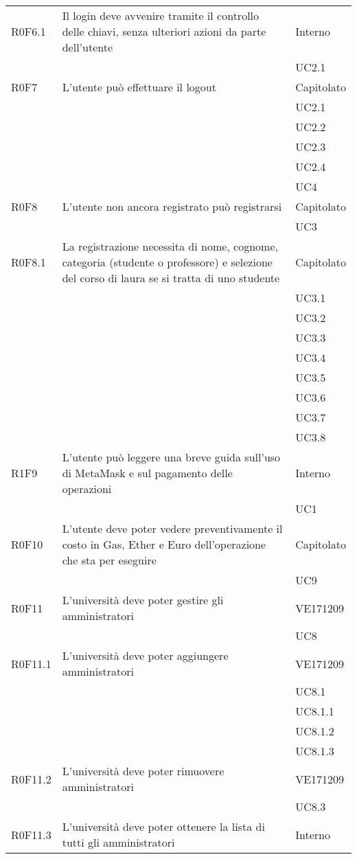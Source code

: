 \documentclass[AnalisiDeiRequisiti.tex]{subfiles}
\begin{document}
\begin{longtable}[H]{|p{2cm}|p{5cm}|p{5cm}|}
	R0F6.1 &  Il login deve avvenire tramite il controllo delle chiavi, senza ulteriori azioni da parte dell'utente & Interno \\ 
	& & UC2.1 \\ \hline
	R0F7 &  L'utente può effettuare il logout & Capitolato \\ 
	& & UC2.1  \\
	& & UC2.2 \\
	& & UC2.3 \\
	& & UC2.4 \\ 
	& & UC4 \\ \hline
	R0F8 &  L'utente non ancora registrato può registrarsi & Capitolato \\ 
	& & UC3 \\ \hline
	R0F8.1 &  La registrazione necessita di nome, cognome, categoria (studente o professore) e selezione del corso di laura se si tratta di uno studente & Capitolato \\
	& & UC3.1 \\
	& & UC3.2 \\
	& & UC3.3 \\
	& & UC3.4 \\
	& & UC3.5 \\
	& & UC3.6 \\
	& & UC3.7 \\
	& & UC3.8 \\ \hline
	R1F9 &  L'utente può leggere una breve guida sull'uso di MetaMask e sul pagamento delle operazioni & Interno \\ 
	& & UC1 \\ \hline
	R0F10 &  L'utente deve poter vedere preventivamente il costo in Gas, Ether e Euro dell'operazione che sta per eseguire & Capitolato \\
	& & UC9 \\ \hline
	R0F11 &  L'università deve poter gestire gli amministratori & VE171209 \\
	& & UC8 \\ \hline
	R0F11.1 &  L'università deve poter aggiungere amministratori & VE171209 \\
	& & UC8.1 \\
	& & UC8.1.1 \\ 
	& & UC8.1.2 \\
	& & UC8.1.3 \\ \hline
	R0F11.2 &  L'università deve poter rimuovere amministratori & VE171209 \\
	& & UC8.3 \\ \hline
	R0F11.3 &  L'università deve poter ottenere la lista di tutti gli amministratori & Interno \\

\end{longtable}
\end{document}
